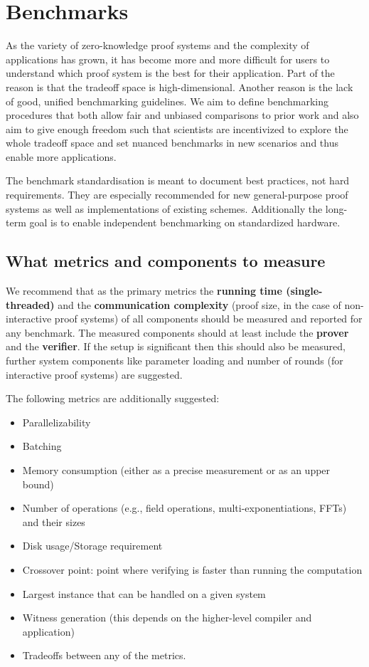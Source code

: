 \section{Benchmarks}
\label{implem:benchmarks}

As the variety of zero-knowledge proof systems and the complexity of applications has grown, it has become more and more difficult for users to understand which proof system is the best for their application.
Part of the reason is that the tradeoff space is high-dimensional.
Another reason is the lack of good, unified benchmarking guidelines.
We aim to define benchmarking procedures that both allow fair and unbiased comparisons to prior work and also aim to give enough freedom such that scientists are incentivized to explore the whole tradeoff space and set nuanced benchmarks in new scenarios and thus enable more applications.


The benchmark standardisation is meant to document best practices, not hard requirements.
They are especially recommended for new general-purpose proof systems as well as implementations of existing schemes.
Additionally the long-term goal is to enable independent benchmarking on standardized hardware.


\subsection{What metrics and components to measure}
\label{implem:benchmarks:metrics-and-components}

We recommend that as the primary metrics the \textbf{running time (single-threaded)} and the \textbf{communication complexity} (proof size, in the case of non-interactive proof systems) of all components should be measured and reported for any benchmark.
The measured components should at least include the \textbf{prover} and the \textbf{verifier}.
If the setup is significant then this should also be measured, further system components like parameter loading and number of rounds (for interactive proof systems) are suggested.

The following metrics are additionally suggested:
\begin{itemize}
\item Parallelizability
\item Batching
\item Memory consumption (either as a precise measurement or as an upper bound)
\item Number of operations (e.g., field operations, multi-exponentiations, FFTs) and their sizes
\item Disk usage/Storage requirement
\item Crossover point: point where verifying is faster than running the computation
\item Largest instance that can be handled on a given system
\item Witness generation (this depends on the higher-level compiler and application)
\item Tradeoffs between any of the metrics.
\end{itemize}


